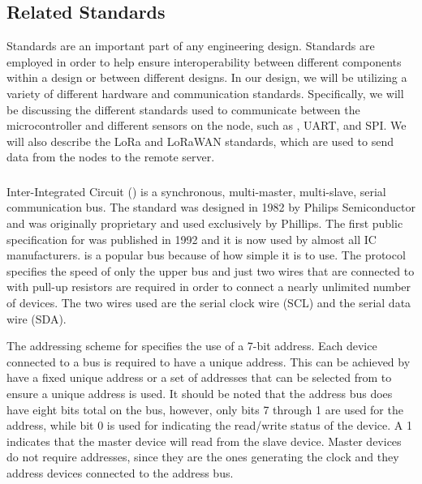\subsection{Related Standards}
Standards are an important part of any engineering design. Standards are employed in order to help ensure interoperability between different components within a design or between different designs. In our design, we will be utilizing a variety of different hardware and communication standards. Specifically, we will be discussing the different standards used to communicate between the microcontroller and different sensors on the node, such as \iic, UART, and SPI. We will also describe the LoRa and LoRaWAN standards, which are used to send data from the nodes to the remote server.

\subsubsection{\iic}
Inter-Integrated Circuit (\iic) is a synchronous, multi-master, multi-slave, serial communication bus. The standard was designed in 1982 by Philips Semiconductor and was originally proprietary and used exclusively by Phillips. The first public specification for \iic  was published in 1992 and it is now used by almost all IC manufacturers. \iic is a popular bus because of how simple it is to use. The protocol specifies the speed of only the upper bus and just two wires that are connected to \Vdd with pull-up resistors are required in order to connect a nearly unlimited number of \iic devices. The two wires used are the serial clock wire (SCL) and the serial data wire (SDA). 

The addressing scheme for \iic specifies the use of a 7-bit address. Each \iic device connected to a bus is required to have a unique address. This can be achieved by have a fixed unique address or a set of \iic addresses that can be selected from to ensure a unique address is used. It should be noted that the address bus does have eight bits total on the bus, however, only bits 7 through 1 are used for the address, while bit 0 is used for indicating the read/write status of the device. A 1 indicates that the master device will read from the slave device. Master devices do not require addresses, since they are the ones generating the clock and they address \iic devices connected to the address bus.

